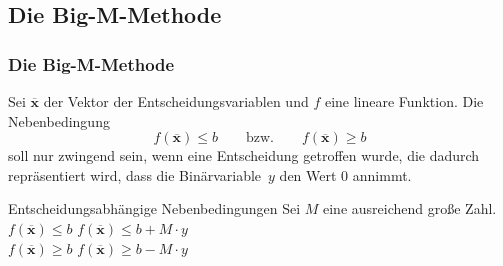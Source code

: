 \subsection{Die Big-M-Methode}
\begin{frame}
 \frametitle{Die Big-M-Methode}
 Sei $\mathbf{\overline{x}}$ der Vektor der Entscheidungsvariablen und $f$ eine lineare Funktion. Die Nebenbedingung
  \[
  f(\mathbf{\overline{x}}) \leq b\qquad\text{bzw.}\qquad f(\mathbf{\overline{x}}) \geq b
  \]
  soll nur zwingend sein, wenn eine Entscheidung getroffen wurde, die dadurch repräsentiert wird, dass die Binärvariable~$y$ den Wert 0 annimmt. 

  \begin{block}{Entscheidungsabhängige Nebenbedingungen}
  Sei $M$ eine ausreichend große Zahl.\\
  $f(\mathbf{\overline{x}}) \leq b$ \quad\textrightarrow{}\quad $f(\mathbf{\overline{x}}) \leq b + M\cdot y$\\
  $f(\mathbf{\overline{x}}) \geq b$ \quad\textrightarrow{}\quad $f(\mathbf{\overline{x}}) \geq b - M\cdot y$
\end{block}
\end{frame}

